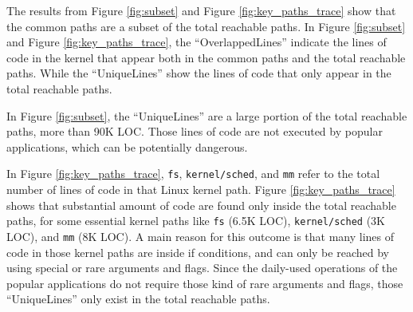 

The results from Figure \ref{fig:subset} and Figure
\ref{fig:key_paths_trace} 
show that the common paths are a subset of the
total reachable paths. 
In Figure \ref{fig:subset} and Figure \ref{fig:key_paths_trace}, 
the ``OverlappedLines'' indicate the lines of code 
in the kernel that appear both in the common paths and the total reachable 
paths. While the ``UniqueLines'' show the lines of code that only appear in 
the total reachable paths.

In Figure \ref{fig:subset}, the ``UniqueLines'' 
are a large portion of the total reachable paths, more than 90K LOC. 
Those lines of code are not executed by popular applications, which can be 
potentially dangerous. 

In Figure \ref{fig:key_paths_trace}, \texttt{fs}, \texttt{kernel/sched}, 
and \texttt{mm} refer to the total number of lines of code in that Linux kernel path. 
Figure \ref{fig:key_paths_trace} shows that 
substantial amount of code are found only inside the total reachable paths, 
for some essential kernel paths like \texttt{fs} (6.5K LOC), 
\texttt{kernel/sched} (3K LOC), 
and \texttt{mm} (8K LOC). 
A main reason for this outcome is that many lines of code in those kernel paths 
are inside if conditions, and can only be reached by using special or 
rare arguments and flags. Since the daily-used operations of 
the popular applications do not require those kind of rare arguments 
and flags, those ``UniqueLines'' only exist in the total reachable paths. 

